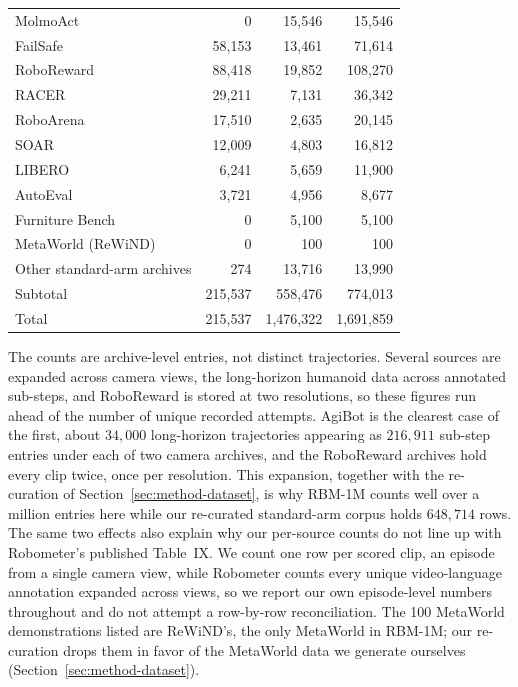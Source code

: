 \begin{table}[h]
\begin{tabular}{@{}p{6.6cm}rrr@{}}
MolmoAct \citep{lee_molmoact_2025} & 0 & 15{,}546 & 15{,}546 \\
FailSafe \citep{lin_failsafe_2025} & 58{,}153 & 13{,}461 & 71{,}614 \\
RoboReward \citep{roboreward} & 88{,}418 & 19{,}852 & 108{,}270 \\
RACER \citep{dai_racer_2025} & 29{,}211 & 7{,}131 & 36{,}342 \\
RoboArena \citep{atreya_roboarena_2025} & 17{,}510 & 2{,}635 & 20{,}145 \\
SOAR \citep{zhou_autonomous_2024} & 12{,}009 & 4{,}803 & 16{,}812 \\
LIBERO \citep{liu_libero_2023} & 6{,}241 & 5{,}659 & 11{,}900 \\
AutoEval \citep{zhou_autoeval_2025} & 3{,}721 & 4{,}956 & 8{,}677 \\
Furniture Bench \citep{heo_furniturebench_2023} & 0 & 5{,}100 & 5{,}100 \\
MetaWorld (ReWiND) \citep{zhang_rewind_2025} & 0 & 100 & 100 \\
Other standard-arm archives & 274 & 13{,}716 & 13{,}990 \\
\quad Subtotal & 215{,}537 & 558{,}476 & 774{,}013 \\
\midrule
Total & 215{,}537 & 1{,}476{,}322 & 1{,}691{,}859 \\
\bottomrule
\end{tabular}
\end{table}

The counts are archive-level entries, not distinct trajectories. Several sources are expanded across camera views, the long-horizon humanoid data across annotated sub-steps, and RoboReward is stored at two resolutions, so these figures run ahead of the number of unique recorded attempts. AgiBot is the clearest case of the first, about $34{,}000$ long-horizon trajectories appearing as $216{,}911$ sub-step entries under each of two camera archives, and the RoboReward archives hold every clip twice, once per resolution. This expansion, together with the re-curation of Section~\ref{sec:method-dataset}, is why RBM-1M counts well over a million entries here while our re-curated standard-arm corpus holds $648{,}714$ rows. The same two effects also explain why our per-source counts do not line up with Robometer's published Table~IX. We count one row per scored clip, an episode from a single camera view, while Robometer counts every unique video-language annotation expanded across views, so we report our own episode-level numbers throughout and do not attempt a row-by-row reconciliation. The 100 MetaWorld demonstrations listed are ReWiND's, the only MetaWorld in RBM-1M; our re-curation drops them in favor of the MetaWorld data we generate ourselves (Section~\ref{sec:method-dataset}).

